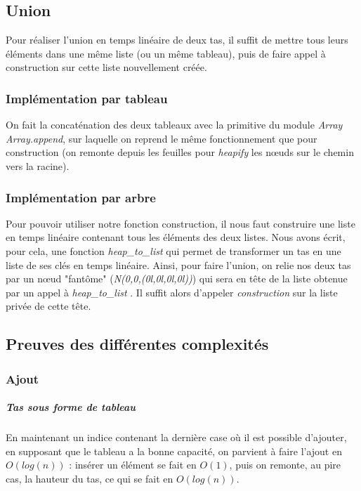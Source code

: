 \documentclass[12pt,a4paper]{article}
\begin{document}
\subsection{Union}

Pour réaliser l'union en temps linéaire de deux tas, il suffit de mettre tous leurs éléments dans une même liste (ou un même tableau), puis de faire appel à construction sur cette liste nouvellement créée.

\subsubsection{Implémentation par tableau}

On fait la concaténation des deux tableaux avec la primitive du module \textit{Array} \textit{Array.append}, sur laquelle on reprend le même fonctionnement que pour construction (on remonte depuis les feuilles pour \textit{heapify} les nœuds sur le chemin vers la racine).


\subsubsection{Implémentation par arbre}

Pour pouvoir utiliser notre fonction construction, il nous faut construire une liste en temps linéaire contenant tous les éléments des deux listes. Nous avons écrit, pour cela, une fonction \textit{heap\_to\_list} qui permet de transformer un tas en une liste de ses clés en temps linéaire. Ainsi, pour faire l'union, on relie nos deux tas par un nœud "fantôme" (\textit{N(0,0,(0l,0l,0l,0l))}) qui sera en tête de la liste obtenue par un appel à \textit{heap\_to\_list} . Il suffit alors d'appeler \textit{construction} sur la liste privée de cette tête.


\subsection{Preuves des différentes complexités}

\subsubsection{Ajout}

\subparagraph{Tas sous forme de tableau}

En maintenant un indice contenant la dernière case où il est possible d'ajouter, en supposant que le tableau a la bonne capacité, on parvient à faire l'ajout en $O(log (n) ) $ : insérer un élément se fait en $O(1)$, puis on remonte, au pire cas, la hauteur du tas, ce qui se fait en $O(log (n))$.
\end{document}
